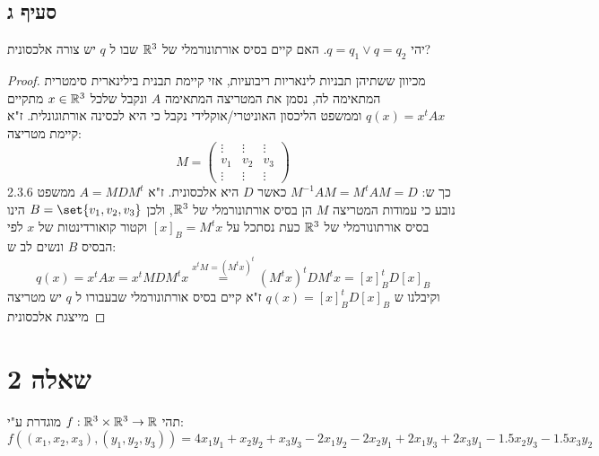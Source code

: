 \documentclass{article}
\DeclarePairedDelimiter\set\{\}
\begin{document}
    \pagebreak
    \subsection*{סעיף ג}
    יהי $q = q_1 \lor q = q_2$. האם קיים בסיס אורתונורמלי של $\mathbb{R}^3$ שבו ל $q$ יש צורה אלכסונית?

    \begin{proof}
        מכיוון ששתיהן תבניות לינאריות ריבועיות, אזי קיימת תבנית בילינארית סימטרית המתאימה לה, נסמן את המטריצה המתאימה $A$
        ונקבל שלכל $x \in \mathbb{R}^3$ מתקיים $q(x) = x^t A x$ וממשפט הליכסון האוניטרי/אוקלידי נקבל כי היא לכסינה אורתוגונלית.
        ז"א קיימת מטריצה:
        \[
        M =  \begin{pmatrix}
            \vdots & \vdots & \vdots\\
            v_1    & v_2    & v_3 \\
            \vdots & \vdots & \vdots
        \end{pmatrix}
        \] כך ש: $M^{-1}AM = M^t A M = D$ כאשר $D$ היא אלכסונית. ז"א $A = M D M^t$
        ממשפט 2.3.6 נובע כי עמודות המטריצה $M$ הן בסיס אורתונורמלי של $\mathbb{R}^3$, ולכן $B = \set{v_1, v_2, v_3}$
        הינו בסיס אורתונורמלי של $\mathbb{R}^3$ כעת נסתכל על $[x]_B = M^tx$ וקטור קואורדינטות של $x$ לפי הבסיס $B$
        ונשים לב ש:
        \[
        q(x) = x^t A x = x^t M D M^t x \overset{x^t M = (M^t x)^t}= (M^t x)^t D M^t x = [x]_B^t D [x]_B
         \]
         וקיבלנו ש $q(x) = [x]_B^t D [x]_B$ ז"א קיים בסיס אורתונורמלי שבעבורו ל $q$ יש מטריצה מייצגת אלכסונית
    \end{proof}



    \pagebreak
    \section*{שאלה 2}
    תהי $f: \mathbb{R}^3 \times \mathbb{R}^3 \rightarrow \mathbb{R}$ מוגדרת ע"י:
    \[
    f((x_1, x_2, x_3), (y_1, y_2, y_3)) = 4x_1y_1 + x_2y_2 + x_3y_3 - 2x_1y_2 -2x_2y_1 + 2x_1y_3 + 2x_3y_1 -1.5x_2y_3 - 1.5x_3y_2
    \]
\end{document}
